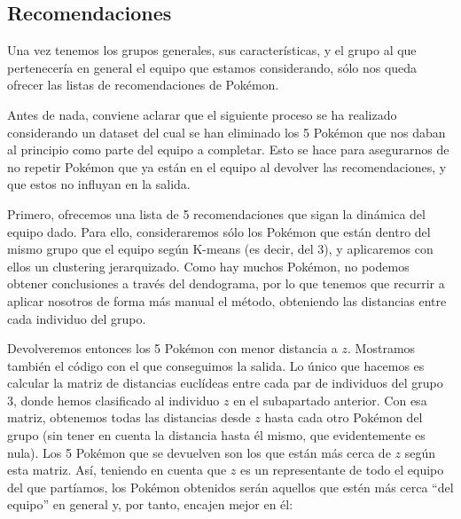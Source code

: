 \documentclass[
  12pt,
]{extreport}
\begin{document}
\subsection{Recomendaciones}\label{recomendaciones}

Una vez tenemos los grupos generales, sus características, y el grupo al
que pertenecería en general el equipo que estamos considerando, sólo nos
queda ofrecer las listas de recomendaciones de Pokémon.

Antes de nada, conviene aclarar que el siguiente proceso se ha realizado
considerando un dataset del cual se han eliminado los 5 Pokémon que nos
daban al principio como parte del equipo a completar. Esto se hace para
asegurarnos de no repetir Pokémon que ya están en el equipo al devolver
las recomendaciones, y que estos no influyan en la salida.

Primero, ofrecemos una lista de 5 recomendaciones que sigan la dinámica
del equipo dado. Para ello, consideraremos sólo los Pokémon que están
dentro del mismo grupo que el equipo según K-means (es decir, del 3), y
aplicaremos con ellos un clustering jerarquizado. Como hay muchos
Pokémon, no podemos obtener conclusiones a través del dendograma, por lo
que tenemos que recurrir a aplicar nosotros de forma más manual el
método, obteniendo las distancias entre cada individuo del grupo.

Devolveremos entonces los 5 Pokémon con menor distancia a \(z\).
Mostramos también el código con el que conseguimos la salida. Lo único
que hacemos es calcular la matriz de distancias euclídeas entre cada par
de individuos del grupo 3, donde hemos clasificado al individuo \(z\) en
el subapartado anterior. Con esa matriz, obtenemos todas las distancias
desde \(z\) hasta cada otro Pokémon del grupo (sin tener en cuenta la
distancia hasta él mismo, que evidentemente es nula). Los 5 Pokémon que
se devuelven son los que están más cerca de \(z\) según esta matriz.
Así, teniendo en cuenta que \(z\) es un representante de todo el equipo
del que partíamos, los Pokémon obtenidos serán aquellos que estén más
cerca ``del equipo'' en general y, por tanto, encajen mejor en él:

\vspace{1cm}
\end{document}
